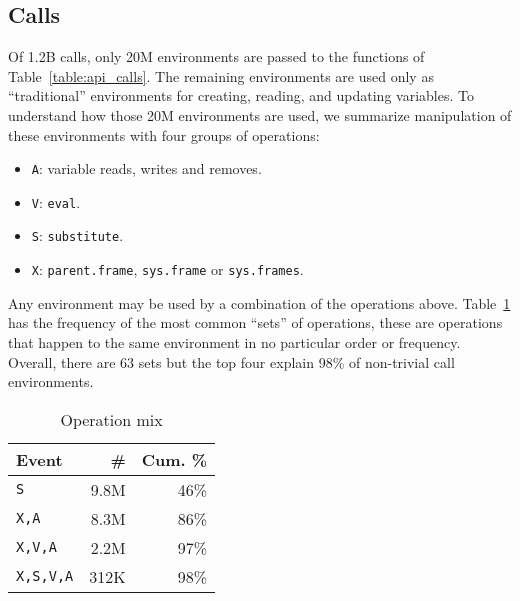 \documentclass[sigplan,screen]{acmart}
\renewcommand{\c}[1]{\lstinline |#1|\xspace}
\newcommand{\eval}{\c{eval}}
\newcommand{\substitute}{\c{substitute}}
\begin{document}
\subsection{Calls}

Of 1.2B calls, only 20M environments are passed to the functions of
Table~\ref{table:api_calls}. The remaining environments are used only as
``traditional'' environments for creating, reading, and updating variables. To
understand how those 20M environments are used, we summarize manipulation
of these environments with four groups of operations:

\begin{itemize}
\item \texttt{A}: variable reads, writes and removes.
\item \texttt{V}: \eval.
\item \texttt{S}: \substitute.
\item \texttt{X}: \c{parent.frame}, \c{sys.frame} or \c{sys.frames}.
\end{itemize}

\noindent
Any environment may be used by a combination of the operations above.
Table~\ref{table:call_env_seq} has the frequency of the most common ``sets'' of
operations, these are operations that happen to the same environment in no
particular order or frequency. Overall, there are 63 sets but the top four
explain 98\% of non-trivial call environments.

\begin{table}[!h]  \small
  \caption{Operation mix} \label{table:call_env_seq}  \centering
  \begin{tabular}{lrr}    \toprule
    \textbf{Event}&\textbf{\#}&\textbf{Cum. \%}\\\midrule
    \texttt{S}&          9.8M & 46\%\\
    \texttt{X,A}&        8.3M & 86\%\\
    \texttt{X,V,A}&      2.2M & 97\%\\
    \texttt{X,S,V,A}   & 312K & 98\%\\\bottomrule
  \end{tabular}
\end{table}
\end{document}
